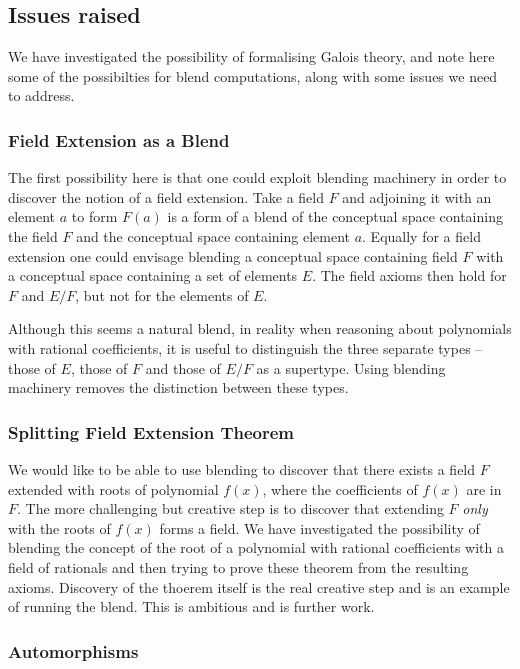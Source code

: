 \subsection{Issues raised}

We have investigated the possibility of formalising Galois theory, and
note here some of the possibilties for blend computations, along with
some issues we need to address.

\subsubsection{Field Extension as a Blend}

The first possibility here is that one could exploit blending
machinery in order to discover the notion of a field extension. Take a
field $F$ and adjoining it with an element $a$ to form $F(a)$ is a
form of a blend of the conceptual space containing the field $F$ and
the conceptual space containing element $a$. Equally for a field
extension one could envisage blending a conceptual space containing
field $F$ with a conceptual space containing a set of elements
$E$. The field axioms then hold for $F$ and $E/F$, but not for the
elements of $E$.

Although this seems a natural blend, in reality when reasoning about
polynomials with rational coefficients, it is useful to distinguish
the three separate types -- those of $E$, those of $F$ and those of
$E/F$ as a supertype. Using blending machinery removes the distinction
between these types.

\subsubsection{Splitting Field Extension Theorem}

We would like to be able to use blending to discover that there exists a
field $F$ extended with roots of polynomial $f(x)$, where the coefficients of $f(x)$ are in $F$. The more challenging but creative step is to discover that extending $F$ {\em only} with the roots of $f(x)$ forms a field. We have investigated the possibility of blending the concept of the root of a polynomial with rational coefficients with a field of rationals and then trying to prove these theorem from the resulting axioms. Discovery of the thoerem itself is the real creative step and is an example of running the blend. This is ambitious and is further work.

\subsubsection{Automorphisms}

